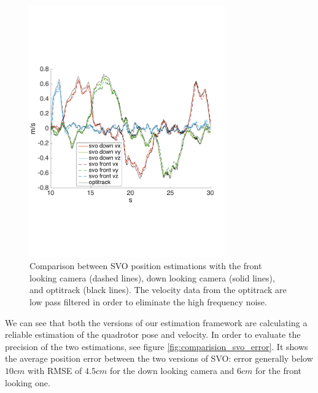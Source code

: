 \begin{figure}[!ht]
    \centering
    \includegraphics[width=0.75\textwidth]{img/comparision_between_two_svo_and_opti_velocities.pdf}
    \caption{Comparison between SVO position estimations with the front looking camera (dashed lines), down looking camera (solid lines), and optitrack (black lines). The velocity data from the optitrack are low pass filtered in order to eliminate the high frequency noise.  }
    \label{fig:comparision_svo_velocities}
\end{figure}

We can see that both the versions of our estimation framework are calculating a reliable estimation of the quadrotor pose and velocity. In order to evaluate the precision of the two estimations, see figure \ref{fig:comparision_svo_error}. It shows the average position error between the two versions of SVO: error generally below $10cm$ with RMSE of $4.5cm$ for the down looking camera and $6cm$ for the front looking one.\\


